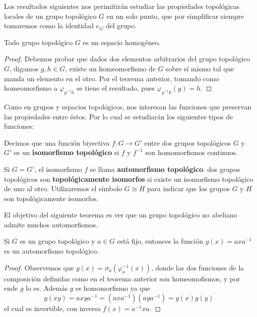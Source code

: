 \documentclass[12pt]{report}
\theoremstyle{largebreak}
\newcommand{\cf}[3]{\ensuremath{#1:#2\rightarrow#3}}
\begin{document}
    Los resultados siguientes nos perimitirán estudiar las propiedades topológicas locales de un grupo topológico $G$ en un solo punto, que por simplificar siempre tomaremos como la identidad $e_G$ del grupo.

    \begin{cor}
        Todo grupo topológico $G$ es un espacio homogéneo.
    \end{cor}

    \begin{proof}
        Debemos probar que dados dos elementos arbitrarios del grupo topológico $G$, digamos $g,h\in G$, existe un homeomorfismo de $G$ sobre sí mismo tal que manda un elemento en el otro. Por el teorema anterior, tomando como homeomorfismo a $\varphi_{g^{-1}h}$ se tiene el resultado, pues $\varphi_{g^{-1}h}(g)=h$.
    \end{proof}

    Como en grupos y espacios topológicos, nos interesan las funciones que preservan las propiedades entre éstos. Por lo cual se estudiarán los siguientes tipos de funciones:

    \begin{mydef}
        Decimos que una función biyectiva $\cf{f}{G}{G'}$ entre dos grupos topológicos $G$ y $G'$ es un \textbf{isomorfismo topológico} si $f$ y $f^{-1}$ son homomorfismos continuos.

        Si $G=G'$, el isomorfismo $f$ se llama \textbf{automorfismo topológico}. dos grupos topológicos son \textbf{topológicamente isomorfos} si existe un isomorfismo topológico de uno al otro. Utilizaremos el símbolo $G\cong H$ para indicar que los grupos $G$ y $H$ son topológicamente isomorfos.
    \end{mydef}

    El objetivo del siguiente teorema es ver que un grupo topológico no abeliano admite muchos automorfismos.

    \begin{theor}
        Si $G$ es un grupo topológico y $a\in G$ está fijo, entonces la función $g(x)=axa^{-1}$ es un automorfismo topológico.
    \end{theor}

    \begin{proof}
        Observemos que $g(x)=\sigma_a(\varphi_{a}^{-1}(x))$, donde las dos funciones de la composición definidas como en el teorema anterior son homeomofismos, y por ende $g$ lo es. Además $g$ es homomorfismo ya que
        \begin{equation*}
            g(xy)=axya^{-1}=\left(axa^{-1}\right)\left(aya^{-1}\right)=g(x)g(y)
        \end{equation*}
        el cual es invertible, con inversa $f(x)=a^{-1}xa$.
    \end{proof}
\end{document}
